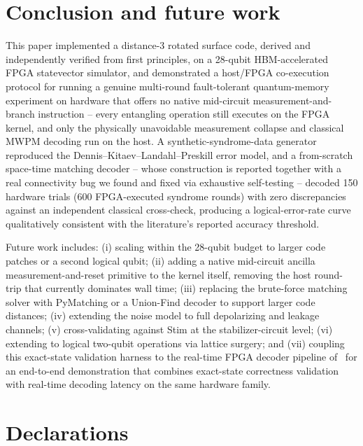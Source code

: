 \documentclass[pdflatex,sn-mathphys,Numbered]{sn-jnl}
\begin{document}
\section{Conclusion and future work}\label{sec:conclusion}

This paper implemented a distance-3 rotated surface code, derived and independently verified from first principles, on a 28-qubit HBM-accelerated FPGA statevector simulator, and demonstrated a host/FPGA co-execution protocol for running a genuine multi-round fault-tolerant quantum-memory experiment on hardware that offers no native mid-circuit measurement-and-branch instruction -- every entangling operation still executes on the FPGA kernel, and only the physically unavoidable measurement collapse and classical MWPM decoding run on the host. A synthetic-syndrome-data generator reproduced the Dennis--Kitaev--Landahl--Preskill error model, and a from-scratch space-time matching decoder -- whose construction is reported together with a real connectivity bug we found and fixed via exhaustive self-testing -- decoded 150 hardware trials (600 FPGA-executed syndrome rounds) with zero discrepancies against an independent classical cross-check, producing a logical-error-rate curve qualitatively consistent with the literature's reported accuracy threshold.

Future work includes: (i) scaling within the 28-qubit budget to larger code patches or a second logical qubit; (ii) adding a native mid-circuit ancilla measurement-and-reset primitive to the kernel itself, removing the host round-trip that currently dominates wall time; (iii) replacing the brute-force matching solver with PyMatching or a Union-Find decoder to support larger code distances; (iv) extending the noise model to full depolarizing and leakage channels; (v) cross-validating against Stim at the stabilizer-circuit level; (vi) extending to logical two-qubit operations via lattice surgery; and (vii) coupling this exact-state validation harness to the real-time FPGA decoder pipeline of~\cite{ali_shor_steane_qec} for an end-to-end demonstration that combines exact-state correctness validation with real-time decoding latency on the same hardware family.

\backmatter

\section*{Declarations}
\end{document}
